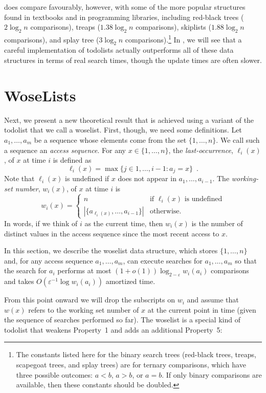 \documentclass[lotsofwhite]{patmorin}
\newcommand{\eps}{\varepsilon}
\begin{document}
 does compare favourably, however, with some of the
more popular structures found in textbooks and in programming libraries,
including red-black trees ($2\log_2 n$ comparisons), treaps ($1.38\log_2
n$ comparisons), skiplists ($1.88\log_2 n$ comparisons), and splay tree
($3\log_2 n$ comparisons).\footnote{The constants listed here for the
binary search trees (red-black trees, treaps, scapegoat trees, and splay
trees) are for ternary comparisons, which have three possible outcomes:
$a<b$, $a>b$, or $a=b$. If only binary comparisons are available, then
these constants should be doubled.} In , we will see
that a careful implementation of todolists actually outperforms all of
these data structures in terms of real search times, though the update
times are often slower.


\section{WoseLists}

Next, we present a new theoretical result that is achieved using a
variant of the todolist that we call a woselist.  First, though, we need
some definitions.  Let $a_1,\ldots,a_m$ be a sequence whose elements come
from the set $\{1,\ldots,n\}$.  We call such a sequence an \emph{access
sequence}. For any $x\in\{1,\ldots,n\}$, the \emph{last-occurrence},
$\ell_i(x)$, of $x$ at time $i$ is defined as
\[
   \ell_i(x)=\max\{j\in{1,\ldots,i-1}: a_{j} = x\} \enspace .
\]
Note that $\ell_i(x)$ is undefined if $x$ does not appear in
$a_1,\ldots,a_{i-1}$.  The \emph{working-set number}, $w_i(x)$, of $x$
at time $i$ is
\[
    w_i(x) = \begin{cases}
               n & \text{if $\ell_i(x)$ is undefined} \\
               |\{a_{\ell_i(x)},\ldots,a_{i-1}\}| & \text{otherwise.}
             \end{cases}
\]
In words, if we think of $i$ as the current time, then $w_i(x)$ is the
number of distinct values in the access sequence since the most recent
access to $x$.

In this section, we describe the woselist data structure, which stores
$\{1,\ldots,n\}$ and, for any access sequence $a_1,\ldots,a_m$, can
execute searches for $a_1,\ldots,a_m$ so that the search for $a_i$
performs at most $(1+o(1))\log_{2-\eps} w_i(a_i)$ comparisons and takes
$O(\eps^{-1}\log w_i(a_i))$ amortized time.

From this point onward we will drop the subscripts on $w_i$ and assume that $w(x)$ refers to the working set number of $x$ at the current point in time (given the sequence of searches performed so far).
The woselist is a special kind of todolist that weakens Property~1 and adds an additional Property~5:
\end{document}
